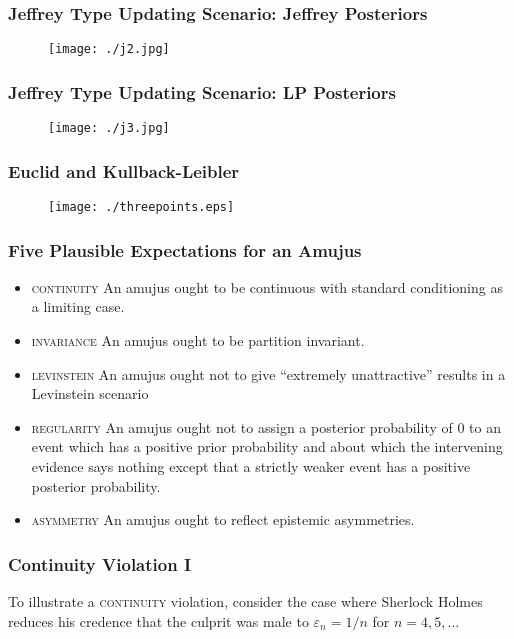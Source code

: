 \documentclass[xcolor=dvipsnames]{beamer}
\begin{document}
\begin{frame}
  \frametitle{Jeffrey Type Updating Scenario: Jeffrey Posteriors}
  \begin{figure}[h]
    \texttt{[image: ./j2.jpg]}
  \end{figure}
\end{frame}

\begin{frame}
  \frametitle{Jeffrey Type Updating Scenario: LP Posteriors}
  \begin{figure}[h]
    \texttt{[image: ./j3.jpg]}
  \end{figure}
\end{frame}

\begin{frame}
  \frametitle{Euclid and Kullback-Leibler}
  \begin{figure}[h]
    \texttt{[image: ./threepoints.eps]}
  \end{figure}
\end{frame}

\begin{frame}
  \frametitle{Five Plausible Expectations for an Amujus}
\begin{itemize}
\item \textsc{continuity} An amujus ought to be continuous with
  standard conditioning as a limiting case.
\item \textsc{invariance} An amujus ought to be partition invariant.
\item \textsc{levinstein} An amujus ought not to give ``extremely
    unattractive'' results in a Levinstein scenario
\item \textsc{regularity} An amujus ought not to assign a posterior
  probability of $0$ to an event which has a positive prior
  probability and about which the intervening evidence says nothing
  except that a strictly weaker event has a positive posterior
  probability.
\item \textsc{asymmetry} An amujus ought to reflect epistemic
  asymmetries.
\end{itemize}
\end{frame}

\begin{frame}
  \frametitle{Continuity Violation I}
To illustrate a \textsc{continuity} violation, consider the case where
Sherlock Holmes reduces his credence that the culprit was male to
$\varepsilon_{n}=1/n$ for $n=4,5,\ldots$
\end{frame}
\end{document}
